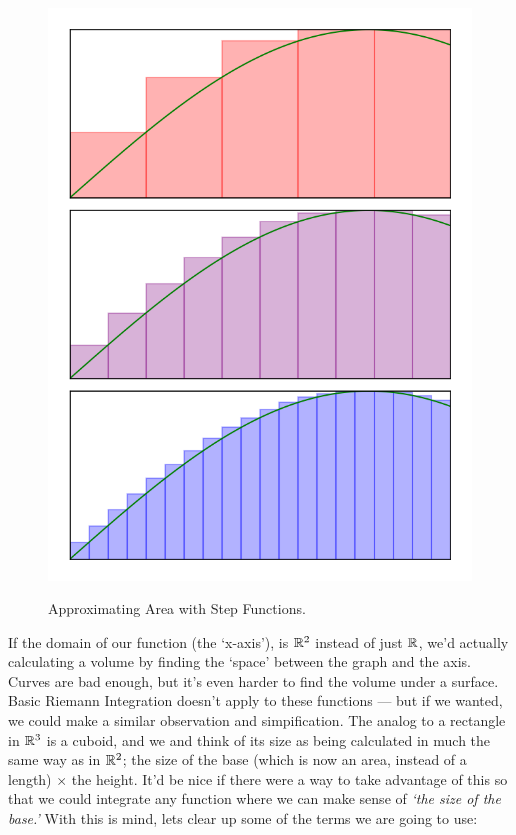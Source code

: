 \begin{figure}[H]
{		\includegraphics{Code/Area4.png}}
	\caption{Approximating Area with Step Functions.}
	\label{fig:areaapprox}
\end{figure}

If the domain of our function (the `x-axis'), is $\mathbb{R}^2$ instead of just $\mathbb{R}$, we'd actually calculating a volume by finding the `space' between the graph and the axis. Curves are bad enough, but it's even harder to find the volume under a surface. Basic Riemann Integration doesn't apply to these functions --- but if we wanted, we could make a similar observation and simpification. The analog to a rectangle in $\mathbb{R}^3$ is a cuboid, and we and think of its size as being calculated in much the same way as in $\mathbb{R}^2$; the size of the base (which is now an area, instead of a length) $\times$ the height. It'd be nice if there were a way to take advantage of this so that we could integrate any function where we can make sense of \emph{`the size of the base.'} With this is mind, lets clear up some of the terms we are going to use:

